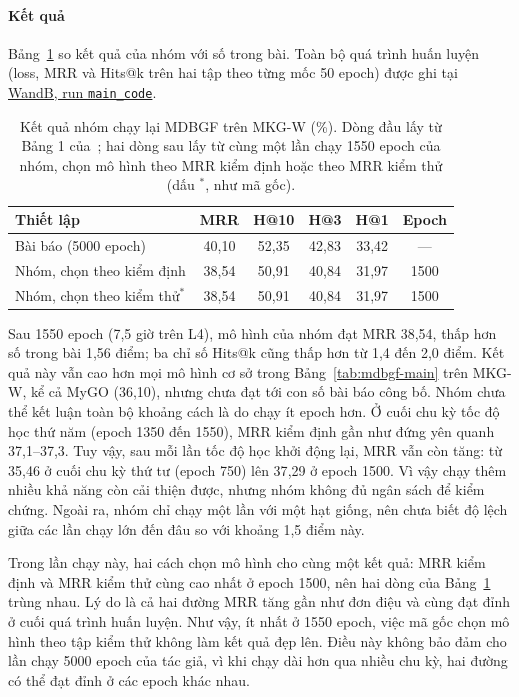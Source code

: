 \documentclass[conference,a4paper]{IEEEtran}
\begin{document}
\paragraph{Kết quả} Bảng~\ref{tab:mdbgf-repro} so kết quả của nhóm với số trong bài. Toàn bộ quá trình huấn luyện (loss, MRR và Hits@k trên hai tập theo từng mốc 50 epoch) được ghi tại \href{https://wandb.ai/minhdatngo-forwork-ho-chi-minh-city-university-of-science/mdbgf-reproduce/runs/xxejayyu}{WandB, run \texttt{main\_code}}.

\begin{table}[t]
\centering
\caption{Kết quả nhóm chạy lại MDBGF trên MKG-W (\%). Dòng đầu lấy từ Bảng 1 của~\cite{mdbgf}; hai dòng sau lấy từ cùng một lần chạy 1550 epoch của nhóm, chọn mô hình theo MRR kiểm định hoặc theo MRR kiểm thử (dấu $^{*}$, như mã gốc).}
\label{tab:mdbgf-repro}
\footnotesize
\setlength{\tabcolsep}{3.5pt}
\begin{tabular}{l cccc c}
\toprule
Thiết lập & MRR & H@10 & H@3 & H@1 & Epoch\\
\midrule
Bài báo (5000 epoch)        & 40{,}10 & 52{,}35 & 42{,}83 & 33{,}42 & ---\\
\midrule
Nhóm, chọn theo kiểm định   & 38{,}54 & 50{,}91 & 40{,}84 & 31{,}97 & 1500\\
Nhóm, chọn theo kiểm thử$^{*}$ & 38{,}54 & 50{,}91 & 40{,}84 & 31{,}97 & 1500\\
\bottomrule
\end{tabular}
\end{table}

Sau 1550 epoch (7{,}5 giờ trên L4), mô hình của nhóm đạt MRR 38{,}54, thấp hơn số trong bài 1{,}56 điểm; ba chỉ số Hits@k cũng thấp hơn từ 1{,}4 đến 2{,}0 điểm. Kết quả này vẫn cao hơn mọi mô hình cơ sở trong Bảng~\ref{tab:mdbgf-main} trên MKG-W, kể cả MyGO (36{,}10), nhưng chưa đạt tới con số bài báo công bố. Nhóm chưa thể kết luận toàn bộ khoảng cách là do chạy ít epoch hơn. Ở cuối chu kỳ tốc độ học thứ năm (epoch 1350 đến 1550), MRR kiểm định gần như đứng yên quanh 37{,}1--37{,}3. Tuy vậy, sau mỗi lần tốc độ học khởi động lại, MRR vẫn còn tăng: từ 35{,}46 ở cuối chu kỳ thứ tư (epoch 750) lên 37{,}29 ở epoch 1500. Vì vậy chạy thêm nhiều khả năng còn cải thiện được, nhưng nhóm không đủ ngân sách để kiểm chứng. Ngoài ra, nhóm chỉ chạy một lần với một hạt giống, nên chưa biết độ lệch giữa các lần chạy lớn đến đâu so với khoảng 1{,}5 điểm này.

Trong lần chạy này, hai cách chọn mô hình cho cùng một kết quả: MRR kiểm định và MRR kiểm thử cùng cao nhất ở epoch 1500, nên hai dòng của Bảng~\ref{tab:mdbgf-repro} trùng nhau. Lý do là cả hai đường MRR tăng gần như đơn điệu và cùng đạt đỉnh ở cuối quá trình huấn luyện. Như vậy, ít nhất ở 1550 epoch, việc mã gốc chọn mô hình theo tập kiểm thử không làm kết quả đẹp lên. Điều này không bảo đảm cho lần chạy 5000 epoch của tác giả, vì khi chạy dài hơn qua nhiều chu kỳ, hai đường có thể đạt đỉnh ở các epoch khác nhau.
\end{document}

